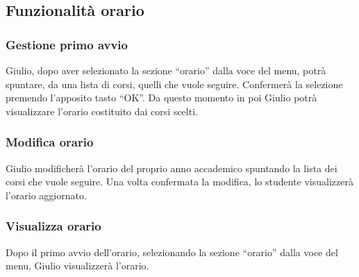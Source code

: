 \subsection{Funzionalità orario}

\subsubsection{Gestione primo avvio}

Giulio, dopo aver selezionato la sezione “orario” dalla voce del menu, potrà spuntare, da una lista di corsi, quelli che vuole seguire. Confermerà la selezione premendo l’apposito tasto “OK”. Da questo momento in poi Giulio potrà visualizzare l’orario costituito dai corsi scelti. 

\subsubsection{Modifica orario}

Giulio modificherà l’orario del proprio anno accademico spuntando la lista dei corsi che vuole seguire. Una volta confermata la modifica, lo studente visualizzerà l’orario aggiornato. 

\subsubsection{Visualizza orario}

Dopo il primo avvio dell’orario, selezionando la sezione “orario” dalla voce del menu, Giulio visualizzerà l’orario.